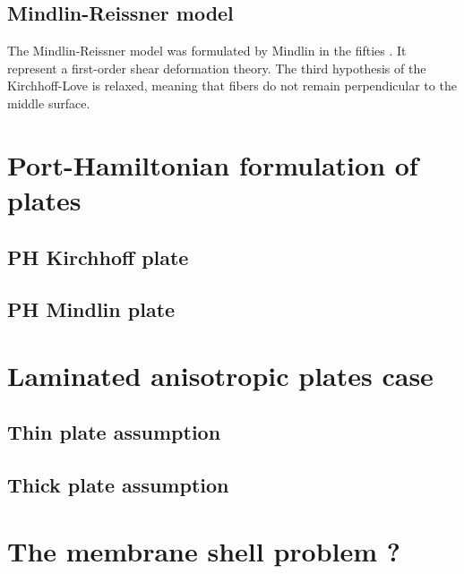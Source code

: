 \subsection{Mindlin-Reissner model}
The Mindlin-Reissner model was formulated by Mindlin in the fifties \cite{mindlin1951}. It represent a first-order shear deformation theory. The third hypothesis of the Kirchhoff-Love is relaxed, meaning that fibers do not remain perpendicular to the middle surface. 

\section{Port-Hamiltonian formulation of plates}

\subsection{PH Kirchhoff plate}\label{sec:pHkirchh}

\subsection{PH Mindlin plate}


\section{Laminated anisotropic plates case}

\subsection{Thin plate assumption}

\subsection{Thick plate assumption}


\section{The membrane shell problem ?}